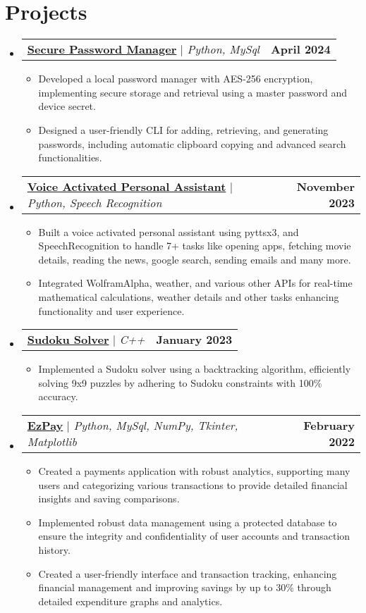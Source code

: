 \documentclass[letterpaper,11pt]{article}
\makeatletter
\newcommand{\resumeItem}[1]{
  \item\small{
    {#1 \vspace{-2pt}}
  }
}
\newcommand{\resumeProjectHeading}[2]{
    \item
    \begin{tabular*}{1.001\textwidth}{l@{\extracolsep{\fill}}r}
      \small#1 & \textbf{\small #2}\\
    \end{tabular*}\vspace{-7pt}
}
\newcommand{\resumeSubHeadingListStart}{\begin{itemize}[leftmargin=0.0in, label={}]}
\newcommand{\resumeSubHeadingListEnd}{\end{itemize}}
\newcommand{\resumeItemListStart}{\begin{itemize}}
\newcommand{\resumeItemListEnd}{\end{itemize}\vspace{-5pt}}
\makeatother
\begin{document}
\section{Projects}
    \vspace{-5pt}
    \resumeSubHeadingListStart
    \resumeProjectHeading
          {\textbf{\href{https://github.com/kartik2607/Secure-Password-Manager}{Secure Password Manager}} $|$ \emph{Python, MySql}}{April 2024}
          \resumeItemListStart
            \resumeItem{Developed a local password manager with AES-256 encryption, implementing secure storage and retrieval using a master password and device secret.}
            \resumeItem{Designed a user-friendly CLI for adding, retrieving, and generating passwords, including automatic clipboard copying and advanced search functionalities.}
          \resumeItemListEnd
        \vspace{-20pt}
         \resumeProjectHeading
          {\textbf{\href{https://github.com/kartik2607/Voice-Activated-Personal-Assistant}{Voice Activated Personal Assistant}} $|$ \emph{Python, Speech Recognition}}{November 2023}
          \resumeItemListStart
            \resumeItem{Built a voice activated personal assistant using pyttsx3, and SpeechRecognition to handle 7+ tasks like opening apps, fetching movie details, reading the news, google search, sending emails and many more.}
            \resumeItem{Integrated WolframAlpha, weather, and various other APIs for real-time mathematical calculations, weather details and other tasks enhancing functionality and user experience.}
          \resumeItemListEnd
        \vspace{-20pt}
      \resumeProjectHeading
        {{\textbf{\href{https://github.com/kartik2607/Sudoku-Solver}{Sudoku Solver}}} $|$ \emph{C++}}{January 2023}
          \resumeItemListStart
            \resumeItem{Implemented a Sudoku solver using a backtracking algorithm, efficiently solving 9x9 puzzles by adhering to Sudoku constraints with 100\% accuracy.}
          \resumeItemListEnd
        \vspace{-20pt}
        \resumeProjectHeading
          {\textbf{\href{https://github.com/kartik2607/EzPay}{EzPay}} $|$ \emph{Python, MySql, NumPy, Tkinter, Matplotlib}}{February 2022}
          \resumeItemListStart
            \resumeItem{Created a payments application with robust analytics, supporting many users and categorizing various transactions to provide detailed financial insights and saving comparisons.}
            \resumeItem{Implemented robust data management using a protected database to ensure the integrity and confidentiality of user accounts and transaction history.}
            \resumeItem{Created a user-friendly interface and transaction tracking, enhancing financial management and improving savings by up to 30\% through detailed expenditure graphs and analytics.}
          \resumeItemListEnd
    \resumeSubHeadingListEnd
\vspace{-16pt}
\end{document}
